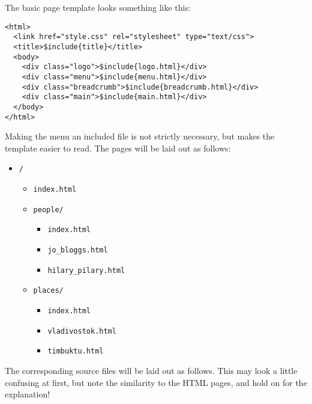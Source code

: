 \documentclass[english]{scrartcl}
\begin{document}
\begin{enumerate}
The basic page template looks something like this:

\begin{verbatim}
<html>
  <link href="style.css" rel="stylesheet" type="text/css">
  <title>$include{title}</title>
  <body>
    <div class="logo">$include{logo.html}</div>
    <div class="menu">$include{menu.html}</div>
    <div class="breadcrumb">$include{breadcrumb.html}</div>
    <div class="main">$include{main.html}</div>
  </body>
</html>
\end{verbatim}

Making the menu an included file is not strictly necessary, but makes the template easier to read. The pages will be laid out as follows:

\begin{itemize}
\item \verb|/|
  \begin{itemize}
  \item \verb|index.html|
  \item \verb|people/|
    \begin{itemize}
    \item \verb|index.html|
    \item \verb|jo_bloggs.html|
    \item \verb|hilary_pilary.html|
    \end{itemize}
  \item \verb|places/|
    \begin{itemize}
    \item \verb|index.html|
    \item \verb|vladivostok.html|
    \item \verb|timbuktu.html|
    \end{itemize}
  \end{itemize}
\end{itemize}

The corresponding source files will be laid out as follows. This may look a little confusing at first, but note the similarity to the HTML pages, and hold on for the explanation!


\end{enumerate}
\end{document}

